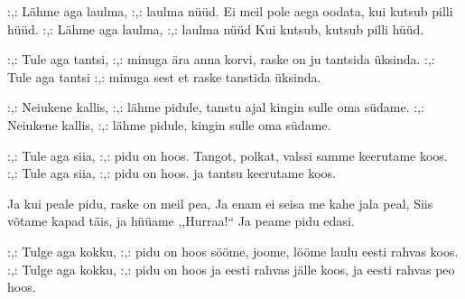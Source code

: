 :,: L\"ahme aga laulma, :,: laulma n\"u\"ud.
Ei meil pole aega oodata, kui kutsub pilli h\"u\"ud.
:,: L\"ahme aga laulma, :,: laulma n\"u\"ud
Kui kutsub, kutsub pilli h\"u\"ud.

:,: Tule aga tantsi, :,: minuga
\"ara anna korvi, raske on ju
tantsida \"uksinda.
:,: Tule aga tantsi :,: minuga
sest et  raske tanstida \"uksinda.

:,: Neiukene kallis, :,: l\"ahme pidule,
tanstu ajal kingin sulle oma s\"udame.
:,: Neiukene kallis, :,: l\"ahme pidule,
kingin sulle oma s\"udame.

:,: Tule aga siia, :,: pidu on hoos.
Tangot, polkat, valssi samme
keerutame koos.
:,: Tule aga siia, :,: pidu on hoos.
ja tantsu keerutame koos.

Ja kui peale pidu, raske on meil pea,
Ja enam ei seisa me kahe jala peal,
Siis v\~otame kapad t\"ais, ja h\"u\"uame ,,Hurraa!{``}
Ja peame pidu edasi.

:,: Tulge aga kokku, :,: pidu on hoos
s\"o\"ome, joome, l\"o\"ome laulu
eesti rahvas koos.
:,: Tulge aga kokku, :,: pidu on hoos
ja eesti rahvas j\"alle koos,
ja eesti rahvas peo hoos.